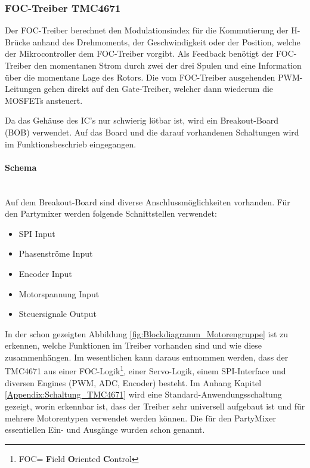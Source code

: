\subsubsection{FOC-Treiber TMC4671}
\label{subsubsec:FOC-Treiber_TMC4671}

Der FOC-Treiber berechnet den Modulationsindex für die Kommutierung der H-Brücke anhand des Drehmoments, der Geschwindigkeit oder der Position, welche der Mikrocontroller dem FOC-Treiber vorgibt. Als Feedback benötigt der FOC-Treiber den momentanen Strom durch zwei der drei Spulen und eine Information über die momentane Lage des Rotors. Die vom FOC-Treiber ausgehenden PWM-Leitungen gehen direkt auf den Gate-Treiber, welcher dann wiederum die MOSFETs ansteuert.

Da das Gehäuse des IC's nur schwierig lötbar ist, wird ein Breakout-Board (BOB) verwendet.
Auf das Board und die darauf vorhandenen Schaltungen wird im Funktionsbeschrieb eingegangen.
\newpage
\paragraph{Schema}\label{par:Schaltungsaufbau_TMC4671}\mbox{}\\

Auf dem Breakout-Board sind diverse Anschlussmöglichkeiten vorhanden. Für den Partymixer werden folgende Schnittstellen verwendet:

\begin{itemize}
\item SPI Input
\item Phasenströme Input
\item Encoder Input
\item Motorspannung Input
\item Steuersignale Output
\end{itemize}

In der schon gezeigten Abbildung \ref{fig:Blockdiagramm_Motorengruppe} ist zu erkennen, welche Funktionen im Treiber vorhanden sind und wie diese zusammenhängen. Im wesentlichen kann daraus entnommen werden, dass der TMC4671 aus einer FOC-Logik\footnote{FOC= \textbf{F}ield \textbf{O}riented \textbf{C}ontrol}, einer Servo-Logik, einem SPI-Interface und diversen Engines (PWM, ADC, Encoder) besteht. Im Anhang Kapitel \ref{Appendix:Schaltung_TMC4671} wird eine Standard-Anwendungsschaltung gezeigt, worin erkennbar ist, dass der Treiber sehr universell aufgebaut ist und für mehrere Motorentypen verwendet werden können. Die für den PartyMixer essentiellen Ein- und Ausgänge wurden schon genannt.

